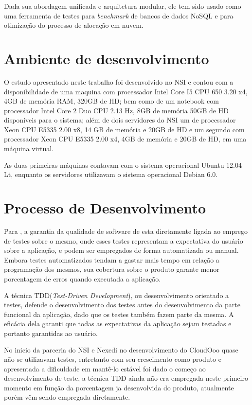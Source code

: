 Dada sua abordagem unificada e arquitetura modular, ele tem sido usado como uma ferramenta de testes para \textit{benchmark} de bancos de dados NoSQL e para otimização do processo de alocação em nuvem.


\section{Ambiente de desenvolvimento}
\label{maquinas}

O estudo apresentado neste trabalho foi desenvolvido no NSI e contou com a disponibilidade de uma maquina com processador Intel Core I5 CPU 650 3.20 x4, 4GB de memória RAM, 320GB de HD; bem como de um notebook com processador Intel Core 2 Duo CPU 2.13 Hz, 8GB de memória 50GB de HD disponíveis para o sistema; além de dois servidores do NSI um de processador Xeon CPU E5335 2.00 x8, 14 GB de memória e 20GB de HD e um segundo com processador Xeon CPU E5335 2.00 x4, 4GB de memória e 20GB de HD, em uma máquina virtual.

As duas primeiras máquinas contavam com o sistema operacional Ubuntu 12.04 Lt, enquanto os servidores utilizavam o sistema operacional Debian 6.0.


\section{Processo de Desenvolvimento}

Para \cite{PRESSMAN}, a garantia da qualidade de software de esta diretamente ligada ao emprego de testes sobre o mesmo, onde esses testes representam a expectativa do usuário sobre a aplicação, e podem ser empregados de forma automatizada ou manual. Embora testes automatizados tendam a gastar mais tempo em relação a programação dos mesmos, sua cobertura sobre o produto garante menor porcentagem de erros quando executada a aplicação.

A técnica TDD(\textit{Test-Driven Development}), ou desenvolvimento orientado a testes, defende o desenvolvimento dos testes antes do desenvolvimento da parte funcional da aplicação, dado que os testes também fazem parte da mesma. A eficácia dela garanti que todas as expectativas da aplicação sejam testadas e portanto garantidas ao usuário.

No inicio da parceria do NSI e Nexedi no desenvolvimento do CloudOoo quase não se utilizavam testes, entretanto com seu crescimento como produto e apresentada a dificuldade em mantê-lo estável foi dado o começo ao desenvolvimento de teste, a técnica TDD ainda não era empregada neste primeiro momento em função da porcentagem ja desenvolvida do produto, atualmente porém vêm sendo empregada diretamente.

